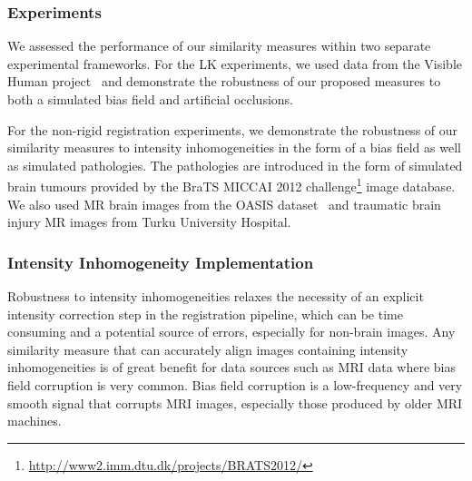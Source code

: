 \subsubsection{Experiments}\label{subsubsec:singl_img_3d_lk_experiments}
We assessed the performance of our similarity measures within two separate
experimental frameworks. For the LK experiments, we used data from the Visible
Human project~\cite{RefWorks:81} and demonstrate the robustness of our proposed
measures to both a simulated bias field and artificial occlusions.

For the non-rigid registration experiments, we demonstrate the robustness of our
similarity measures to intensity inhomogeneities in the form of a bias field as
well as simulated pathologies. The pathologies are introduced in the form of
simulated brain tumours provided by the BraTS MICCAI 2012
challenge\footnote{\url{http://www2.imm.dtu.dk/projects/BRATS2012/}} image
database. We also used MR brain images from the OASIS
dataset~\cite{marcus2007open} and traumatic brain injury MR images from Turku
University Hospital.
\subsubsection{Intensity Inhomogeneity Implementation}\label{subsubsec:bias_fields}
Robustness to intensity inhomogeneities relaxes the necessity of an explicit
intensity correction step in the registration pipeline, which can be time
consuming and a potential source of errors, especially for non-brain images. Any
similarity measure that can accurately align images containing intensity
inhomogeneities is of great benefit for data sources such as MRI data where bias
field corruption is very common. Bias field corruption is a low-frequency and
very smooth signal that corrupts MRI images, especially those produced by older
MRI machines.

